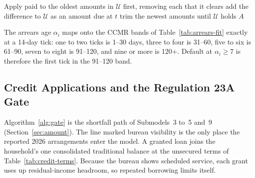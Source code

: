 \begin{algorithm}[!htbp]
\caption{Oldest-first arrears ageing}
\label{alg:age}
\begin{algorithmic}
 
    \State Apply paid to the oldest amounts in $\mathcal{U}$ first, removing each that it clears
        \State add the difference to $\mathcal{U}$ as an amount due at $t$
    \Else
        \State trim the newest amounts until $\mathcal{U}$ holds $A$
    \EndIf
\EndFunction
\end{algorithmic}
\end{algorithm}

The arrears age $\alpha_i$ maps onto the \ac{CCMR} bands of Table~\ref{tab:arrears-fit} exactly at a
14-day tick: one to two ticks is 1--30 days, three to four is 31--60, five to six is 61--90,
seven to eight is 91--120, and nine or more is 120+. Default at $\alpha_i \geq 7$ is therefore the
first tick in the 91--120 band.

\subsection{Credit Applications and the Regulation 23A Gate}\label{app:main-gate}

Algorithm~\ref{alg:gate} is the shortfall path of Submodels~3 to~5 and~9
(Section~\ref{sec:amount}). The line marked bureau visibility is the only place the reported 2026
arrangements enter the model. A granted loan joins the household's one consolidated traditional
balance at the unsecured terms of Table~\ref{tab:credit-terms}. Because the bureau shows
scheduled service, each grant uses up residual-income headroom, so repeated borrowing limits
itself.

